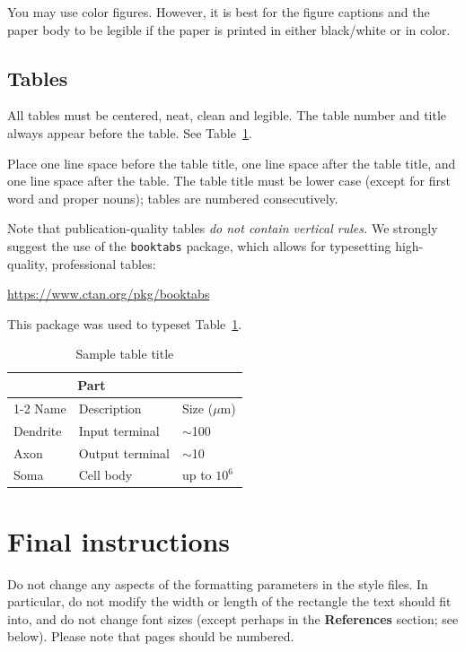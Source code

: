 \documentclass{article}
\begin{document}
You may use color figures.  However, it is best for the figure captions and the
paper body to be legible if the paper is printed in either black/white or in
color.


\subsection{Tables}


All tables must be centered, neat, clean and legible.  The table number and
title always appear before the table.  See Table~\ref{sample-table}.


Place one line space before the table title, one line space after the
table title, and one line space after the table. The table title must
be lower case (except for first word and proper nouns); tables are
numbered consecutively.


Note that publication-quality tables \emph{do not contain vertical rules.} We
strongly suggest the use of the \verb+booktabs+ package, which allows for
typesetting high-quality, professional tables:
\begin{center}
  \url{https://www.ctan.org/pkg/booktabs}
\end{center}
This package was used to typeset Table~\ref{sample-table}.


\begin{table}
  \caption{Sample table title}
  \label{sample-table}
  \centering
  \begin{tabular}{lll}
    \toprule
    \multicolumn{2}{c}{Part}                   \\
    \cmidrule(r){1-2}
    Name     & Description     & Size ($\mu$m) \\
    \midrule
    Dendrite & Input terminal  & $\sim$100     \\
    Axon     & Output terminal & $\sim$10      \\
    Soma     & Cell body       & up to $10^6$  \\
    \bottomrule
  \end{tabular}
\end{table}


\section{Final instructions}


Do not change any aspects of the formatting parameters in the style files.  In
particular, do not modify the width or length of the rectangle the text should
fit into, and do not change font sizes (except perhaps in the
\textbf{References} section; see below). Please note that pages should be
numbered.
\end{document}
